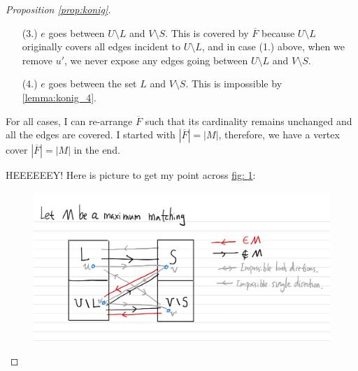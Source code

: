 \documentclass[]{article}
\theoremstyle{definition}
\begin{document}
\begin{proof}[Proposition \ref*{prop:konig}]
\begin{enumerate}
            \item [(3.)] $e$ goes between $U\setminus L$ and $V\setminus S$. This is covered by $\overline F$ because $U\setminus L$ originally covers all edges incident to $U\setminus L$, and in case (1.) above, when we remove $u'$, we never expose any edges going between $U\setminus L$ and $V\setminus S$. 
            \item [(4.)] $e$ goes between the set $L$ and $V\setminus S$. This is impossible by \hyperref[lemma:konig_4]{\ref*{lemma:konig_4}}. 
        \end{enumerate}
        For all cases, I can re-arrange $\overline F$ such that its cardinality remains unchanged and all the edges are covered. I started with $|\overline F| = |M|$, therefore, we have a vertex cover $|\overline{F}| = |M|$ in the end. 
        \par
        HEEEEEEY! Here is picture to get my point across \hyperref[fig:1]{fig: \ref*{fig:1}}:
        \begin{figure}[h]\label{fig:1}
            \centering
            \includegraphics[width=12cm]{fig1.jpeg}
        \end{figure}
    \end{proof}
\end{document}
